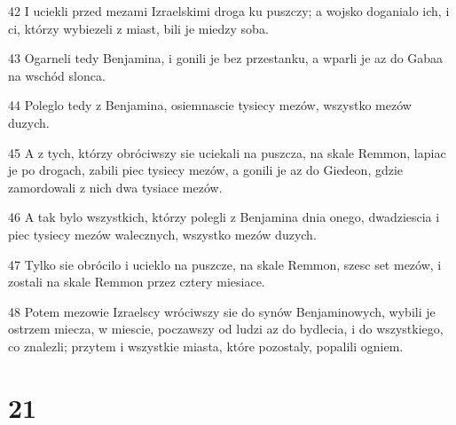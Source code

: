 \par 42 I uciekli przed mezami Izraelskimi droga ku puszczy; a wojsko doganialo ich, i ci, którzy wybiezeli z miast, bili je miedzy soba.
\par 43 Ogarneli tedy Benjamina, i gonili je bez przestanku, a wparli je az do Gabaa na wschód slonca.
\par 44 Poleglo tedy z Benjamina, osiemnascie tysiecy mezów, wszystko mezów duzych.
\par 45 A z tych, którzy obróciwszy sie uciekali na puszcza, na skale Remmon, lapiac je po drogach, zabili piec tysiecy mezów, a gonili je az do Giedeon, gdzie zamordowali z nich dwa tysiace mezów.
\par 46 A tak bylo wszystkich, którzy polegli z Benjamina dnia onego, dwadziescia i piec tysiecy mezów walecznych, wszystko mezów duzych.
\par 47 Tylko sie obrócilo i ucieklo na puszcze, na skale Remmon, szesc set mezów, i zostali na skale Remmon przez cztery miesiace.
\par 48 Potem mezowie Izraelscy wróciwszy sie do synów Benjaminowych, wybili je ostrzem miecza, w miescie, poczawszy od ludzi az do bydlecia, i do wszystkiego, co znalezli; przytem i wszystkie miasta, które pozostaly, popalili ogniem.

\chapter{21}

